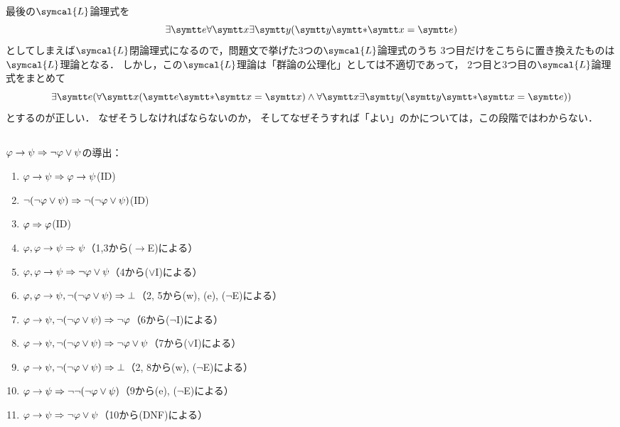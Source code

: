 最後の\(\symcal{L}\)論理式を
\[
	\exists \obj{e} \forall \obj{x} \exists \obj{y} \paren{\obj{y} \obj{\ast} \obj{x} = \obj{e}}
\]
としてしまえば\(\symcal{L}\)閉論理式になるので，問題文で挙げた3つの\(\symcal{L}\)論理式のうち
3つ目だけをこちらに置き換えたものは\(\symcal{L}\)理論となる．
しかし，この\(\symcal{L}\)理論は「群論の公理化」としては不適切であって，
2つ目と3つ目の\(\symcal{L}\)論理式をまとめて
\[
	\exists \obj{e} \paren{
		\forall \obj{x} \paren{\obj{e} \obj{\ast} \obj{x} = \obj{x}}
		\land \forall \obj{x} \exists \obj{y} \paren{\obj{y} \obj{\ast} \obj{x} = \obj{e}}
	}
\]
とするのが正しい．
なぜそうしなければならないのか，
そしてなぜそうすれば「よい」のかについては，この段階ではわからない．

\subsection*{}

\(\varphi \to \psi \Rightarrow \lnot \varphi \lor \psi\)の導出：
\begin{enumerate}
	\item \(\varphi \to \psi \Rightarrow \varphi \to \psi\)\quad (ID)
	\item \(\lnot \paren{\lnot \varphi \lor \psi} \sequent \lnot \paren{\lnot \varphi \lor \psi}\)\quad (ID)
	\item \(\varphi \Rightarrow \varphi\)\quad (ID)
	\item \(\varphi, {\varphi \to \psi} \Rightarrow \psi\)\quad （1,3から(\(\to\)E)による）
	\item \(\varphi, {\varphi \to \psi} \Rightarrow \lnot \varphi \lor \psi\)\quad （4から(\(\lor\)I)による）
	\item \(\varphi, {\varphi \to \psi}, \lnot \paren{\lnot \varphi \lor \psi} \sequent \bot\)\quad （2, 5から(w), (e), (\(\lnot\)E)による）
	\item \(\varphi \to \psi, \lnot \paren{\lnot \varphi \lor \psi} \sequent \lnot \varphi\)\quad （6から(\(\lnot\)I)による）
	\item \(\varphi \to \psi, \lnot \paren{\lnot \varphi \lor \psi} \sequent \lnot \varphi \lor \psi\)\quad （7から(\(\lor\)I)による）
	\item \(\varphi \to \psi, \lnot \paren{\lnot \varphi \lor \psi} \sequent \bot\)\quad （2, 8から(w), (\(\lnot\)E)による）
	\item \(\varphi \to \psi \sequent \lnot \lnot \paren{\lnot \varphi \lor \psi}\)\quad （9から(e), (\(\lnot\)E)による）
	\item \(\varphi \to \psi \Rightarrow \lnot \varphi \lor \psi\)\quad （10から(DNF)による）
\end{enumerate}

